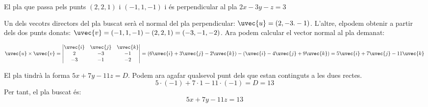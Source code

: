 \begin{llista}
  \item El pla que passa pels punts $(2,2,1)$ i $(-1,1,-1)$ i és perpendicular al pla $2x-3y-z=3$

Un dels vecotrs directors del pla buscat serà el normal del pla perpendicular: $\uvec{u}=(2,-3.-1)$. L'altre, elpodem obtenir a partir dels dos punts donats: $\uvec{v}=(-1,1,-1)-(2,2,1)=(-3,-1,-2)$. Ara podem calcular el vector normal al pla demanat:

\[
\uvec{u} \times \uvec{v}=
\begin{vmatrix}
\uvec{i} & \uvec{j} & \uvec{k} \\
2 & -3 & -1\\
-3 & -1 & -2
\end{vmatrix}=
(6\uvec{i}+3\uvec{j}-2\uvec{k})-(\uvec{i}-4\uvec{j}+9\uvec{k})=5\uvec{i}+7\uvec{j}-11\uvec{k}
\]

El pla tindrà la forma $5x+7y-11z=D$. Podem ara agafar qualsevol punt dels que estan continguts a les dues rectes.
\[
5\cdot(-1)+7\cdot1-11\cdot(-1)=D=13
\]
Per tant, el pla buscat és:
\[
5x+7y-11z=13
\]


\end{llista}
